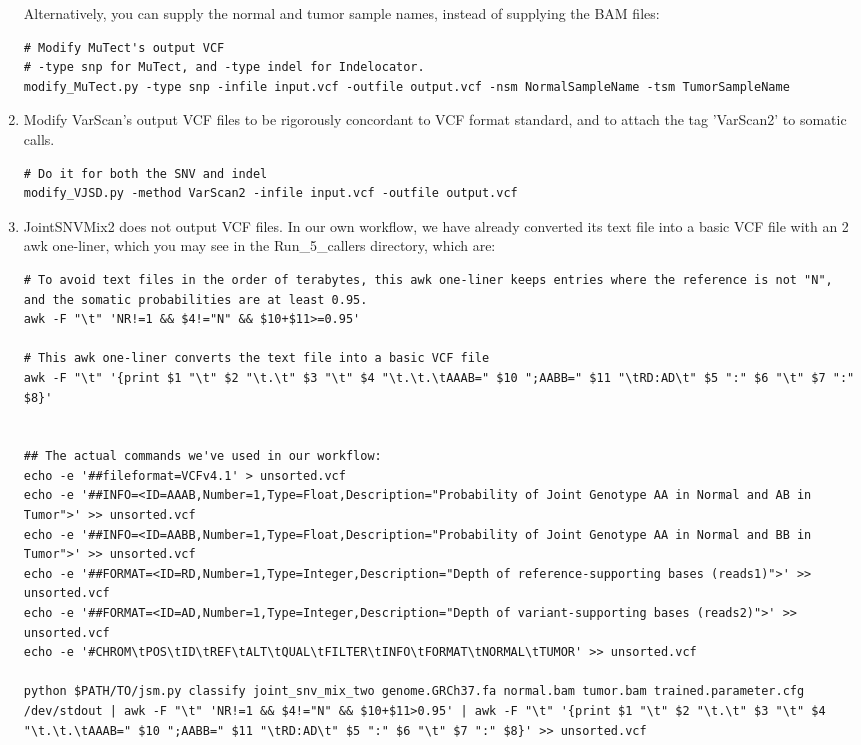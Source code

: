 \documentclass[10pt,letterpaper]{article}
\begin{document}
\begin{sloppypar}
\begin{enumerate}
Alternatively, you can supply the normal and tumor sample names, instead of supplying the BAM files:
\begin{lstlisting}
# Modify MuTect's output VCF
# -type snp for MuTect, and -type indel for Indelocator.
modify_MuTect.py -type snp -infile input.vcf -outfile output.vcf -nsm NormalSampleName -tsm TumorSampleName
\end{lstlisting}

\item
Modify VarScan's output VCF files to be rigorously concordant to VCF format standard, and to attach the tag 'VarScan2' to somatic calls. 
\begin{lstlisting}
# Do it for both the SNV and indel
modify_VJSD.py -method VarScan2 -infile input.vcf -outfile output.vcf
\end{lstlisting}
	

\item
JointSNVMix2 does not output VCF files. In our own workflow, we have already converted its text file into a basic VCF file with an 2 awk one-liner, which you may see in the Run\_5\_callers directory, which are:

\begin{lstlisting}
# To avoid text files in the order of terabytes, this awk one-liner keeps entries where the reference is not "N", and the somatic probabilities are at least 0.95.
awk -F "\t" 'NR!=1 && $4!="N" && $10+$11>=0.95'
	
# This awk one-liner converts the text file into a basic VCF file
awk -F "\t" '{print $1 "\t" $2 "\t.\t" $3 "\t" $4 "\t.\t.\tAAAB=" $10 ";AABB=" $11 "\tRD:AD\t" $5 ":" $6 "\t" $7 ":" $8}'


## The actual commands we've used in our workflow:
echo -e '##fileformat=VCFv4.1' > unsorted.vcf
echo -e '##INFO=<ID=AAAB,Number=1,Type=Float,Description="Probability of Joint Genotype AA in Normal and AB in Tumor">' >> unsorted.vcf
echo -e '##INFO=<ID=AABB,Number=1,Type=Float,Description="Probability of Joint Genotype AA in Normal and BB in Tumor">' >> unsorted.vcf
echo -e '##FORMAT=<ID=RD,Number=1,Type=Integer,Description="Depth of reference-supporting bases (reads1)">' >> unsorted.vcf
echo -e '##FORMAT=<ID=AD,Number=1,Type=Integer,Description="Depth of variant-supporting bases (reads2)">' >> unsorted.vcf
echo -e '#CHROM\tPOS\tID\tREF\tALT\tQUAL\tFILTER\tINFO\tFORMAT\tNORMAL\tTUMOR' >> unsorted.vcf

python $PATH/TO/jsm.py classify joint_snv_mix_two genome.GRCh37.fa normal.bam tumor.bam trained.parameter.cfg /dev/stdout | awk -F "\t" 'NR!=1 && $4!="N" && $10+$11>0.95' | awk -F "\t" '{print $1 "\t" $2 "\t.\t" $3 "\t" $4 "\t.\t.\tAAAB=" $10 ";AABB=" $11 "\tRD:AD\t" $5 ":" $6 "\t" $7 ":" $8}' >> unsorted.vcf
\end{lstlisting}
	

\end{enumerate}
\end{sloppypar}
\end{document}
